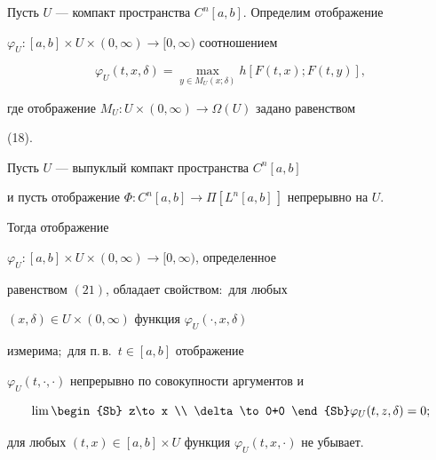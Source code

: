Пусть $U$ --- компакт пространства $C^n[a,b]$. Определим отображение


$\varphi_U:[a,b]\times U\times(0,\infty)\to[0,\infty)$ соотношением


\begin{equation}


\varphi_U(t,x,\delta)=\max_{y\in M_U(x;\delta)}h[F(t,x);F(t,y)],


\end{equation}


где отображение $M_U:U\times(0,\infty)\to\Omega(U)$ задано равенством


(18).





\begin{lem} Пусть $U$ --- выпуклый компакт пространства $C^n[a,b]$


и пусть отображение $\Phi:C^n[a,b]\to\Pi[L^n[a,b]\,]$ непрерывно на $U$.


Тогда отображение


$\varphi_U:[a,b]\times U\times(0,\infty)\to[0,\infty)$, определенное


равенством $(21)$, обладает свойством$:$ для любых


$(x,\delta)\in U\times(0,\infty)$ функция $\varphi_U(\cdot,x,\delta)$


измерима$;$ для п.\,в.~$t\in[a,b]$ отображение


$\varphi_U(t,\cdot,\cdot)$ непрерывно по совокупности аргументов и


\begin{equation}


\lim\begin{Sb} z\to x \\ \delta\to 0+0 \end{Sb}


\varphi_U(t,z,\delta)=0;


\end{equation}


для любых $(t,x)\in[a,b]\times U$ функция $\varphi_U(t,x,\cdot)$ не убывает.


\end{lem}





